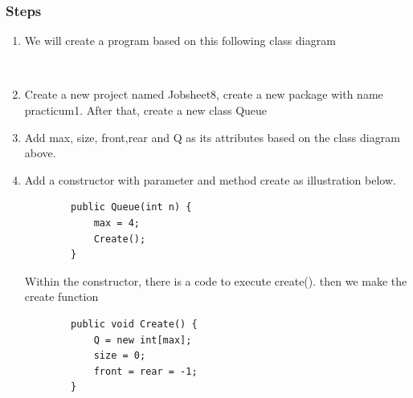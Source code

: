 \documentclass[12pt,titlepage]{article}
\begin{document}
\subsubsection{Steps}
\begin{enumerate}
    \item We will create a program based on this following class diagram
    \mbox{}\\
    \mbox{}\\
    \item Create a new project named Jobsheet8, create a new package with name practicum1. After that, create a new class Queue
    \item Add max, size, front,rear and Q as its attributes based on the class diagram above.
    \item Add a constructor with parameter and method create as illustration below.
    \begin{verbatim}
        public Queue(int n) {
            max = 4;
            Create();
        }
    \end{verbatim}
    Within the constructor, there is a code to execute create(). then we make the create function
    \begin{verbatim}
        public void Create() {
            Q = new int[max];
            size = 0;
            front = rear = -1;
        }
    \end{verbatim}

\end{enumerate}
\end{document}
